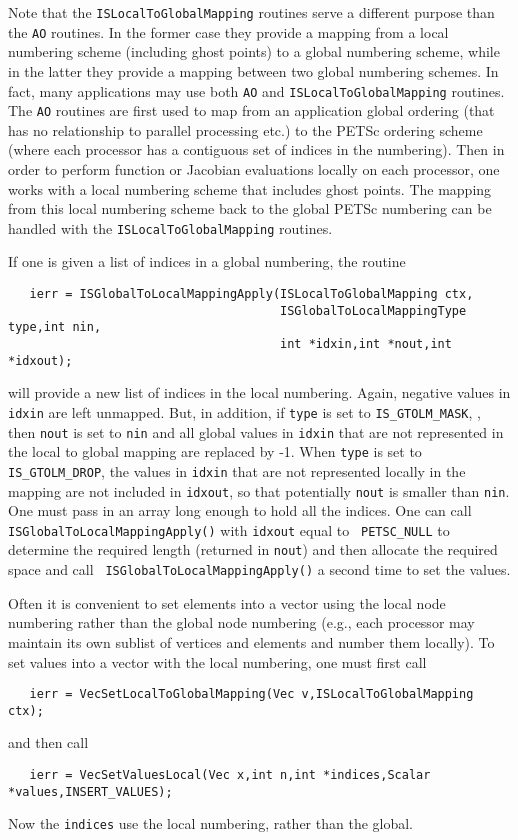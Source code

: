 Note that the {\tt ISLocalToGlobalMapping} routines serve a different purpose
than the {\tt AO}  routines. In the former case they provide a mapping 
from  a local numbering scheme (including ghost points) to a global numbering scheme,
while in the latter they provide a mapping between two global numbering schemes.
In fact, many applications may use both {\tt AO} and {\tt ISLocalToGlobalMapping} routines.
The {\tt AO} routines are first used to map from an application global ordering 
(that has no relationship to parallel processing etc.) to the PETSc ordering scheme
(where each processor has a contiguous set of indices in the numbering). Then in order
to perform function or Jacobian evaluations locally on each processor, one works
with a local numbering scheme that includes ghost points.  The mapping from this local
numbering scheme back to the global PETSc numbering can be handled with the 
{\tt ISLocalToGlobalMapping} routines.

If one is given a list of indices in a global numbering, the routine
\begin{verbatim}
   ierr = ISGlobalToLocalMappingApply(ISLocalToGlobalMapping ctx,
                                      ISGlobalToLocalMappingType type,int nin,
                                      int *idxin,int *nout,int *idxout);
\end{verbatim}
   will provide
a new list of indices in the local numbering. Again, negative values in 
{\tt idxin} are left unmapped.  But, in addition, if {\tt type} is set to {\tt IS\_GTOLM\_MASK},
, then {\tt nout} is set to {\tt nin} and all global values
in {\tt idxin} that are not represented in the local to global mapping
are replaced by -1. When {\tt type} is set to {\tt IS\_GTOLM\_DROP},
 the values in {\tt idxin} that are not
represented locally in the mapping are not included in {\tt idxout}, so that
potentially {\tt nout} is smaller than {\tt nin}.  One must
pass in an array long enough to hold all the indices. One can call
{\tt ISGlobalToLocalMappingApply()} with {\tt idxout} equal to {\tt
PETSC\_NULL} to determine the required length (returned in {\tt nout})
and then allocate the required space and call {\tt
ISGlobalToLocalMappingApply()} a second time to set the values.

Often it is convenient to set elements into a vector using the local node 
numbering rather than the global node numbering (e.g.,  each processor may
maintain its own sublist of vertices and elements and number them locally).
To set values into a vector with the local numbering, one must first call
\begin{verbatim}
   ierr = VecSetLocalToGlobalMapping(Vec v,ISLocalToGlobalMapping ctx);
\end{verbatim}
 
and then call 
\begin{verbatim}
   ierr = VecSetValuesLocal(Vec x,int n,int *indices,Scalar *values,INSERT_VALUES);
\end{verbatim}
Now the {\tt indices} use the local numbering, rather than the global.

